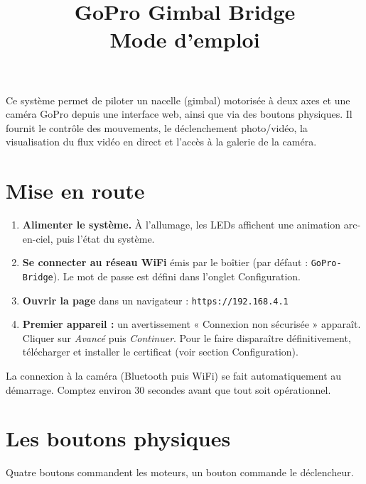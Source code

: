\documentclass[11pt,a4paper]{article}
\title{\textbf{\textcolor{accent}{GoPro Gimbal Bridge}}\\[0.3em]
       \large Mode d'emploi}
\author{}
\date{}
\begin{document}
\maketitle
\thispagestyle{fancy}

\noindent
Ce système permet de piloter un nacelle (gimbal) motorisée à deux axes et une
caméra GoPro depuis une interface web, ainsi que via des boutons physiques.
Il fournit le contrôle des mouvements, le déclenchement photo/vidéo, la
visualisation du flux vidéo en direct et l'accès à la galerie de la caméra.

\tableofcontents
\vspace{1em}

\section{Mise en route}

\begin{enumerate}[leftmargin=*]
  \item \textbf{Alimenter le système.} À l'allumage, les LEDs affichent une
        animation arc-en-ciel, puis l'état du système.
  \item \textbf{Se connecter au réseau WiFi} émis par le boîtier
        (par défaut : \texttt{GoPro-Bridge}). Le mot de passe est défini dans
        l'onglet Configuration.
  \item \textbf{Ouvrir la page} dans un navigateur :
        \texttt{https://192.168.4.1}
  \item \textbf{Premier appareil :} un avertissement « Connexion non sécurisée »
        apparaît. Cliquer sur \emph{Avancé} puis \emph{Continuer}. Pour le faire
        disparaître définitivement, télécharger et installer le certificat
        (voir section Configuration).
\end{enumerate}

\noindent
La connexion à la caméra (Bluetooth puis WiFi) se fait automatiquement au
démarrage. Comptez environ 30 secondes avant que tout soit opérationnel.

\section{Les boutons physiques}

Quatre boutons commandent les moteurs, un bouton commande le déclencheur.
\end{document}
